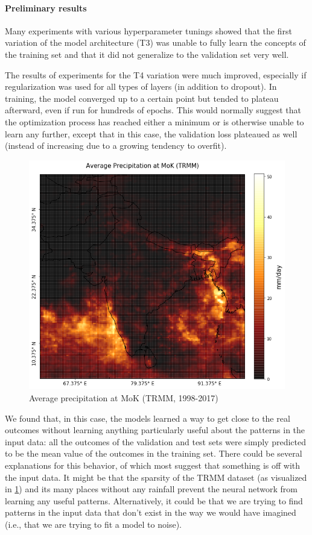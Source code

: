 \paragraph{Preliminary results}
\label{ssst:nn_t3_results}
Many experiments with various hyperparameter tunings showed that the first variation of the model architecture (T3) was unable to fully learn the concepts of the training set and that it did not generalize to the validation set very well.

The results of experiments for the T4 variation were much improved, especially if regularization was used for all types of layers (in addition to dropout). In training, the model converged up to a certain point but tended to plateau afterward, even if run for hundreds of epochs. This would normally suggest that the optimization process has reached either a minimum or is otherwise unable to learn any further, except that in this case, the validation loss plateaued as well (instead of increasing due to a growing tendency to overfit).

\begin{figure}[h]
  \centering
  \includegraphics[width=0.4\linewidth]{./99_appendix/img/prec_avg_onset}
  \caption{Average precipitation at MoK (TRMM, 1998-2017)}
  \label{fig:trmm_prec_onset}
\end{figure}

We found that, in this case, the models learned a way to get close to the real outcomes without learning anything particularly useful about the patterns in the input data: all the outcomes of the validation and test sets were simply predicted to be the mean value of the outcomes in the training set. There could be several explanations for this behavior, of which most suggest that something is off with the input data. It might be that the sparsity of the TRMM dataset (as visualized in \cref{fig:trmm_prec_onset}) and its many places without any rainfall prevent the neural network from learning any useful patterns. Alternatively, it could be that we are trying to find patterns in the input data that don't exist in the way we would have imagined (i.e., that we are trying to fit a model to noise).

